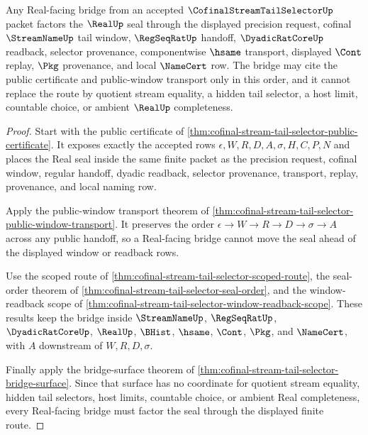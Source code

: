 \begin{theorem}
\label{thm:cofinal-stream-tail-selector-real-seal-bridge}
Any Real-facing bridge from an accepted $\CofinalStreamTailSelectorUp$ packet factors the $\RealUp$ seal through the displayed precision request, cofinal $\StreamNameUp$ tail window, $\RegSeqRatUp$ handoff, $\DyadicRatCoreUp$ readback, selector provenance, componentwise $\hsame$ transport, displayed $\Cont$ replay, $\Pkg$ provenance, and local $\NameCert$ row. The bridge may cite the public certificate and public-window transport only in this order, and it cannot replace the route by quotient stream equality, a hidden tail selector, a host limit, countable choice, or ambient $\RealUp$ completeness.
\end{theorem}
\begin{proof}
Start with the public certificate of \autoref{thm:cofinal-stream-tail-selector-public-certificate}. It exposes exactly the accepted rows $\epsilon,W,R,D,A,\sigma,H,C,P,N$ and places the Real seal inside the same finite packet as the precision request, cofinal window, regular handoff, dyadic readback, selector provenance, transport, replay, provenance, and local naming row.

Apply the public-window transport theorem of \autoref{thm:cofinal-stream-tail-selector-public-window-transport}. It preserves the order $\epsilon \to W \to R \to D \to \sigma \to A$ across any public handoff, so a Real-facing bridge cannot move the seal ahead of the displayed window or readback rows.

Use the scoped route of \autoref{thm:cofinal-stream-tail-selector-scoped-route}, the seal-order theorem of \autoref{thm:cofinal-stream-tail-selector-seal-order}, and the window-readback scope of \autoref{thm:cofinal-stream-tail-selector-window-readback-scope}. These results keep the bridge inside $\StreamNameUp$, $\RegSeqRatUp$, $\DyadicRatCoreUp$, $\RealUp$, $\BHist$, $\hsame$, $\Cont$, $\Pkg$, and $\NameCert$, with $A$ downstream of $W,R,D,\sigma$.

Finally apply the bridge-surface theorem of \autoref{thm:cofinal-stream-tail-selector-bridge-surface}. Since that surface has no coordinate for quotient stream equality, hidden tail selectors, host limits, countable choice, or ambient Real completeness, every Real-facing bridge must factor the seal through the displayed finite route.
\end{proof}

